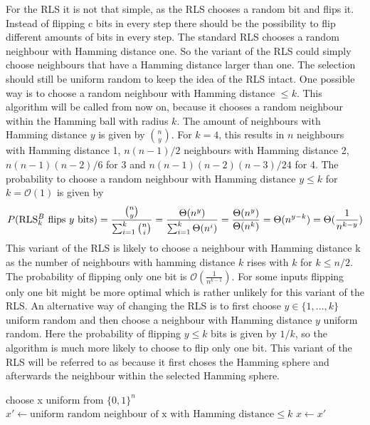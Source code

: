 For the RLS it is not that simple, as the RLS chooses a random bit and flips it.
Instead of flipping c bits in every step there should be the possibility to flip different amounts of bits in every step.
The standard RLS chooses a random neighbour with Hamming distance one.
So the variant of the RLS could simply choose neighbours that have a Hamming distance larger than one.
The selection should still be uniform random to keep the idea of the RLS intact.
One possible way is to choose a random neighbour with Hamming distance $\le k$.
This algorithm will be called \RLSN[k] from now on, because it chooses a random neighbour within the Hamming ball with radius $k$.
The amount of neighbours with Hamming distance $y$ is given by $\binom{n}{y}$.
For $k=4$, this results in $n$ neighbours with Hamming distance 1, $n(n-1)/2$ neighbours with Hamming distance 2, $n(n-1)(n-2)/6$ for 3
and $n(n-1)(n-2)(n-3)/24$ for 4.
The probability to choose a random neighbour with Hamming distance $y \le k$ for $k = \mathcal{O}(1)$ is given by
\[P(\text{RLS$^{B}_{k}$}\text{ flips }y\text{ bits}) = \frac{\binom{n}{y}}{\sum_{i=1}^k \binom{n}{i}} = \frac{\Theta(n^y)}{\sum_{i=1}^k \Theta(n^i)}
      = \frac{\Theta(n^y)}{\Theta(n^k)} = \Theta(n^{y-k}) = \Theta(\frac{1}{n^{k-y}})\]
This variant of the RLS is likely to choose a neighbour with Hamming distance k as the number of neighbours with hamming
distance $k$ rises with $k$ for $k \le n/2$.
The probability of flipping only one bit is $\mathcal{O}(\frac{1}{n^{k-1}})$.
For some inputs flipping only one bit might be more optimal which is rather unlikely for this variant of the RLS.\newline
An alternative way of changing the RLS is to first choose $y \in \{1, \dots, k\}$ uniform random and then choose a neighbour with Hamming distance $y$ uniform random.
Here the probability of flipping $y \le k$ bits is given by $1/k$, so the algorithm is much more likely to choose to flip only one bit.
This variant of the RLS will be referred to as \RLSR[k] because it first choses the Hamming sphere and afterwards the neighbour within the selected Hamming sphere.

\begin{algorithm}[bt]
      \caption{\textsc{\RLSN}}\label{alg:rlsN}

      \DontPrintSemicolon %

      \BlankLine
      choose x uniform from ${\{0,1\}}^n$\;
      {
      $x' \leftarrow \text{uniform random neighbour of x with Hamming distance} \le k$\;
      {
      {
            $x \leftarrow x'$\;
      }
      }
      }
\end{algorithm}

